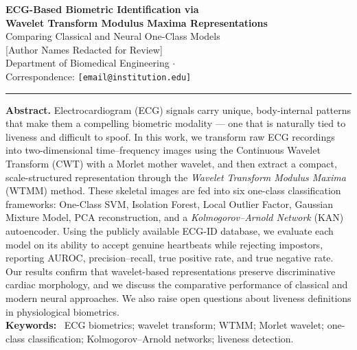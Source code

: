 \documentclass[12pt, a4paper]{article}
\begin{document}
\begin{center}
  {\LARGE\bfseries\color{deepblue}
    ECG-Based Biometric Identification via\\[4pt]
    Wavelet Transform Modulus Maxima Representations
  }\\[10pt]
  {\large\color{medgrey}
    Comparing Classical and Neural One-Class Models
  }\\[16pt]
  {\normalsize [Author Names Redacted for Review]}\\[4pt]
  {\small\color{medgrey}
    Department of Biomedical Engineering \quad $\cdot$ \quad [Institution]\\
    Correspondence: \texttt{[email@institution.edu]}
  }\\[8pt]
  \textcolor{deepblue}{\rule{0.6\linewidth}{0.8pt}}
\end{center}

\vspace{6pt}

\begin{tcolorbox}[
  colback=lightblue, colframe=deepblue,
  boxrule=0.8pt, arc=4pt,
  left=12pt, right=12pt, top=8pt, bottom=8pt
]
  \textbf{\color{deepblue}Abstract.}\quad
  Electrocardiogram (ECG) signals carry unique, body-internal patterns
  that make them a compelling biometric modality --- one that is naturally
  tied to liveness and difficult to spoof.
  In this work, we transform raw ECG recordings into two-dimensional
  time--frequency images using the Continuous Wavelet Transform (CWT)
  with a Morlet mother wavelet, and then extract a compact,
  scale-structured representation through the
  \textit{Wavelet Transform Modulus Maxima} (WTMM) method.
  These skeletal images are fed into six one-class classification
  frameworks: One-Class SVM, Isolation Forest, Local Outlier Factor,
  Gaussian Mixture Model, PCA reconstruction, and a
  \textit{Kolmogorov--Arnold Network} (KAN) autoencoder.
  Using the publicly available ECG-ID database, we evaluate each model
  on its ability to accept genuine heartbeats while rejecting impostors,
  reporting AUROC, precision--recall, true positive rate, and true
  negative rate. Our results confirm that wavelet-based representations
  preserve discriminative cardiac morphology, and we discuss the
  comparative performance of classical and modern neural approaches.
  We also raise open questions about liveness definitions in
  physiological biometrics.\\[4pt]
  \textbf{\color{deepblue}Keywords:}~
  ECG biometrics; wavelet transform; WTMM; Morlet wavelet;
  one-class classification; Kolmogorov--Arnold networks; liveness detection.
\end{tcolorbox}
\end{document}
